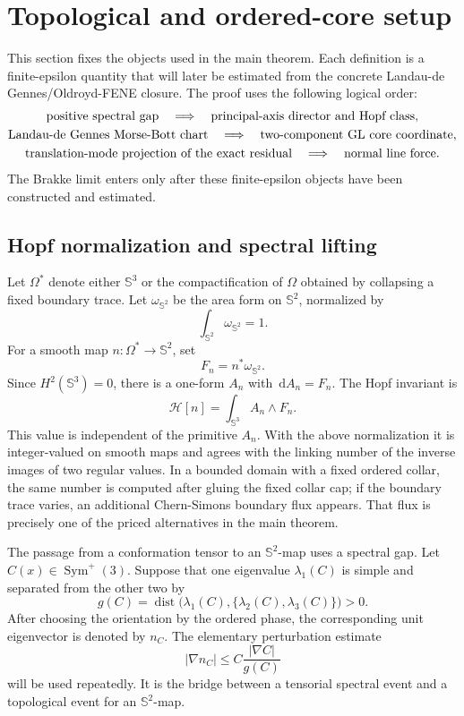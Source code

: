 \documentclass[11pt]{article}
\theoremstyle{definition}
\newcommand{\Sph}{\mathbb S}
\newcommand{\dd}{\,\mathrm d}
\newcommand{\Hopf}{\mathcal H}
\newcommand{\dist}{\operatorname{dist}}
\begin{document}
\section{Topological and ordered-core setup}
\label{sec:setup}

This section fixes the objects used in the main theorem.  Each definition is a
finite-epsilon quantity that will later be estimated from the concrete
Landau-de Gennes/Oldroyd-FENE closure.  The proof uses the following logical
order:
\[
\begin{gathered}
\hbox{positive spectral gap}
\quad\Longrightarrow\quad
\hbox{principal-axis director and Hopf class},\\
\hbox{Landau-de Gennes Morse-Bott chart}
\quad\Longrightarrow\quad
\hbox{two-component GL core coordinate},\\
\hbox{translation-mode projection of the exact residual}
\quad\Longrightarrow\quad
\hbox{normal line force}.
\end{gathered}
\]
The Brakke limit enters only after these finite-epsilon objects have been
constructed and estimated.

\subsection{Hopf normalization and spectral lifting}

Let \(\Omega^\ast\) denote either \(\Sph^3\) or the compactification of
\(\Omega\) obtained by collapsing a fixed boundary trace.  Let
\(\omega_{\Sph^2}\) be the area form on \(\Sph^2\), normalized by
\[
        \int_{\Sph^2}\omega_{\Sph^2}=1 .
\]
For a smooth map \(n:\Omega^\ast\to\Sph^2\), set
\[
        F_n=n^\ast\omega_{\Sph^2}.
\]
Since \(H^2(\Sph^3)=0\), there is a one-form \(A_n\) with
\(\dd A_n=F_n\).  The Hopf invariant is
\[
        \Hopf[n]=\int_{\Sph^3}A_n\wedge F_n .
\]
This value is independent of the primitive \(A_n\).  With the above
normalization it is integer-valued on smooth maps and agrees with the linking
number of the inverse images of two regular values.  In a bounded domain with a
fixed ordered collar, the same number is computed after gluing the fixed collar
cap; if the boundary trace varies, an additional Chern-Simons boundary flux
appears.  That flux is precisely one of the priced alternatives in the main
theorem.

The passage from a conformation tensor to an \(\Sph^2\)-map uses a spectral gap.
Let \(C(x)\in\operatorname{Sym}^+(3)\).  Suppose that one eigenvalue
\(\lambda_1(C)\) is simple and separated from the other two by
\[
        g(C)
        =
        \dist\bigl(\lambda_1(C),
        \{\lambda_2(C),\lambda_3(C)\}\bigr)>0 .
\]
After choosing the orientation by the ordered phase, the corresponding unit
eigenvector is denoted by \(n_C\).  The elementary perturbation estimate
\[
        |\nabla n_C|
        \le
        C\frac{|\nabla C|}{g(C)}
\]
will be used repeatedly.  It is the bridge between a tensorial spectral event
and a topological event for an \(\Sph^2\)-map.
\end{document}
